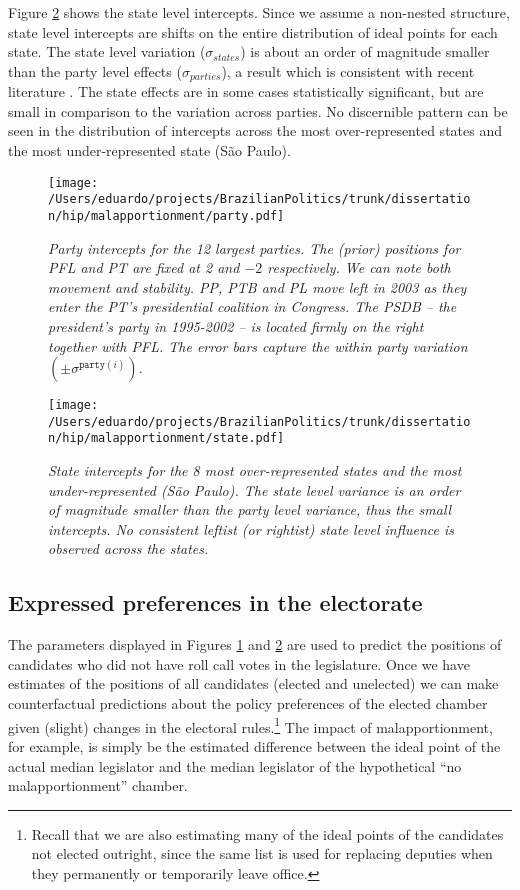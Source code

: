 Figure \ref{fig:state} shows the state level intercepts. Since we assume a  non-nested structure, state level intercepts are shifts on the entire distribution of ideal points for each state. The state level variation ($\sigma_{states}$) is about an order of magnitude smaller than the party level effects ($\sigma_{parties}$), a result which is consistent with recent literature \citep{desposato:2003}. The state effects are in some cases statistically significant, but are small in comparison to the variation across parties. No discernible pattern can be seen in the distribution of  intercepts across the most over-represented states and  the most under-represented state (São Paulo).  

\begin{figure}
  \centering
  \texttt{[image: /Users/eduardo/projects/BrazilianPolitics/trunk/dissertation/hip/malapportionment/party.pdf]}  
  \caption{\emph{Party intercepts for the 12 largest parties. The (prior) positions for PFL and PT are fixed at 2 and $-2$ respectively. We can note both movement and stability. PP, PTB and PL move left in 2003 as they enter the PT's presidential coalition in Congress. The PSDB -- the president's party in 1995-2002 -- is located firmly on the right together with PFL. The error bars capture the within party variation $(\pm\sigma^{\mathtt{party}(i)})$.}}
\label{fig:party}
\end{figure}


\begin{figure}
  \centering
  \texttt{[image: /Users/eduardo/projects/BrazilianPolitics/trunk/dissertation/hip/malapportionment/state.pdf]}  
  \caption{\emph{State intercepts for the 8 most over-represented states and the most under-represented (São Paulo). The state level variance is an order of magnitude smaller than the party level variance, thus the small intercepts. No consistent leftist (or rightist) state level influence is observed across the states.}}
\label{fig:state}
\end{figure}

\subsection*{Expressed preferences in the electorate}

The parameters displayed in Figures \ref{fig:party} and \ref{fig:state} are used to predict the positions of candidates who did not have roll call votes in the legislature. Once we have estimates of the positions of all candidates (elected and unelected) we can make counterfactual predictions about the policy preferences of the elected chamber given (slight) changes in the electoral rules.\footnote{Recall that we are also estimating many of the ideal points of the candidates not elected outright, since the same list is used for replacing deputies when they permanently or temporarily leave office.} The  impact of malapportionment, for example, is  simply be the estimated difference between the ideal point of the actual median legislator and the median legislator of the hypothetical ``no malapportionment'' chamber.

